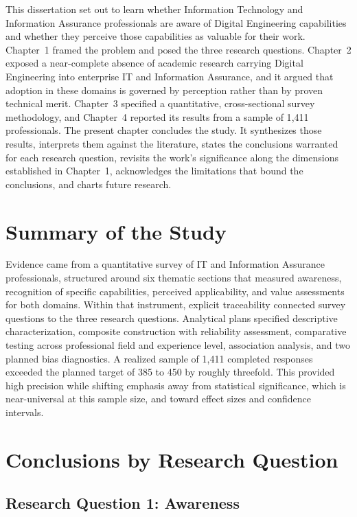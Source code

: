\label{chap:Chapter_5}

This dissertation set out to learn whether Information Technology and Information Assurance professionals are aware of Digital Engineering capabilities and whether they perceive those capabilities as valuable for their work. Chapter~1 framed the problem and posed the three research questions. Chapter~2 exposed a near-complete absence of academic research carrying Digital Engineering into enterprise IT and Information Assurance, and it argued that adoption in these domains is governed by perception rather than by proven technical merit. Chapter~3 specified a quantitative, cross-sectional survey methodology, and Chapter~4 reported its results from a sample of 1{,}411 professionals. The present chapter concludes the study. It synthesizes those results, interprets them against the literature, states the conclusions warranted for each research question, revisits the work's significance along the dimensions established in Chapter~1, acknowledges the limitations that bound the conclusions, and charts future research.

\section{Summary of the Study}

Evidence came from a quantitative survey of IT and Information Assurance professionals, structured around six thematic sections that measured awareness, recognition of specific capabilities, perceived applicability, and value assessments for both domains. Within that instrument, explicit traceability connected survey questions to the three research questions. Analytical plans specified descriptive characterization, composite construction with reliability assessment, comparative testing across professional field and experience level, association analysis, and two planned bias diagnostics. A realized sample of 1{,}411 completed responses exceeded the planned target of 385 to 450 by roughly threefold. This provided high precision while shifting emphasis away from statistical significance, which is near-universal at this sample size, and toward effect sizes and confidence intervals.

\section{Conclusions by Research Question}

\subsection{Research Question 1: Awareness}

